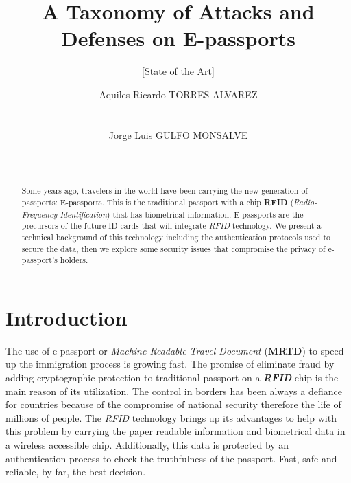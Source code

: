 \documentclass{acm_proc_article-sp}
\begin{document}
\title{A Taxonomy of Attacks and Defenses on E-passports}
\subtitle{[State of the Art]}

\author{
\alignauthor
Aquiles Ricardo TORRES ALVAREZ\\%
       \\
       \\
\alignauthor
Jorge Luis GULFO MONSALVE\\%
       \\
       \\
}

\maketitle
\begin{abstract}
Some years ago, travelers in the world have been carrying the new generation of passports: E-passports. This is the traditional passport with a chip \textbf{RFID} (\emph{Radio-Frequency Identification}) that has biometrical information. E-passports are the precursors of the future ID cards that will integrate \emph{RFID} technology. We present a technical background of this technology including the authentication protocols used to secure the data, then we explore some security issues that compromise the privacy of e-passport’s holders.  

\end{abstract}



\section{Introduction}
The use of e-passport or \emph{Machine Readable Travel Document} (\textbf{MRTD}) to speed up the immigration process is growing fast. The promise of eliminate fraud by adding cryptographic protection to traditional passport on a \emph{\textbf{RFID}} chip is the main reason of its utilization.
The control in borders has been always a defiance for countries because of the compromise of national security therefore the life of millions of people. The \emph{RFID }technology brings up its advantages to help with this problem by carrying the paper readable information and biometrical data in a wireless accessible chip. Additionally, this data is protected by an authentication process to check the truthfulness of the passport. Fast, safe and reliable, by far, the best decision. 
\end{document}
